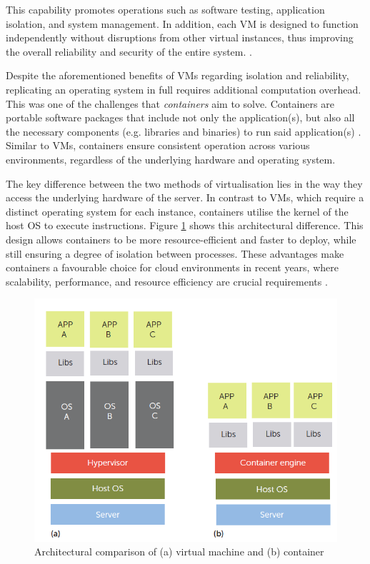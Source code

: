 This capability promotes operations such as software testing, application isolation, and system management. In addition, each VM is designed to function independently without disruptions from other virtual instances, thus improving the overall reliability and security of the entire system. \cite{goldbergSurveyVirtualMachine1974}.

Despite the aforementioned benefits of VMs regarding isolation and reliability, replicating an operating system in full requires additional computation overhead. This was one of the challenges that \textit{containers} aim to solve. Containers are portable software packages that include not only the application(s), but also all the necessary components (e.g. libraries and binaries) to run said application(s) \cite{bernsteinContainersCloudLXC2014}. Similar to VMs, containers ensure consistent operation across various environments, regardless of the underlying hardware and operating system.

The key difference between the two methods of virtualisation lies in the way they access the underlying hardware of the server. In contrast to VMs, which require a distinct operating system for each instance, containers utilise the kernel of the host OS to execute instructions. Figure \ref{fig:vms-vs-containers} shows this architectural difference. This design allows containers to be more resource-efficient and faster to deploy, while still ensuring a degree of isolation between processes. These advantages make containers a favourable choice for cloud environments in recent years, where scalability, performance, and resource efficiency are crucial requirements \cite{bernsteinContainersCloudLXC2014, felterUpdatedPerformanceComparison2015}.

\begin{figure}
    \centering
    \includegraphics[width=0.7\linewidth]{resources/eea3da004befcc5437960cbc868be634.png}
    \caption{Architectural comparison of (a) virtual machine and (b) container \cite{bernsteinContainersCloudLXC2014}}
    \label{fig:vms-vs-containers}
\end{figure}

